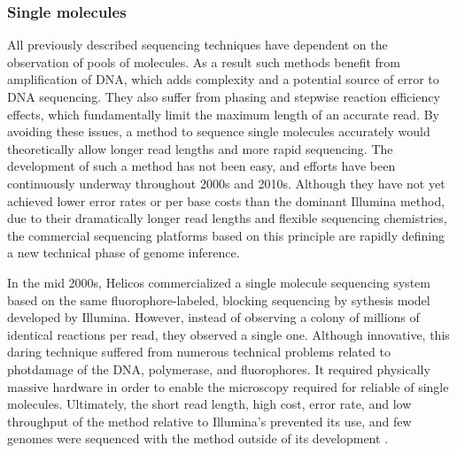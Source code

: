 \subsubsection{Single molecules}

All previously described sequencing techniques have dependent on the observation of pools of molecules.
As a result such methods benefit from amplification of DNA, which adds complexity and a potential source of error to DNA sequencing.
They also suffer from phasing and stepwise reaction efficiency effects, which fundamentally limit the maximum length of an accurate read.
By avoiding these issues, a method to sequence single molecules accurately would theoretically allow longer read lengths and more rapid sequencing.
The development of such a method has not been easy, and efforts have been continuously underway throughout 2000s and 2010s.
Although they have not yet achieved lower error rates or per base costs than the dominant Illumina method, due to their dramatically longer read lengths and flexible sequencing chemistries, the commercial sequencing platforms based on this principle are rapidly defining a new technical phase of genome inference.

In the mid 2000s, Helicos commercialized a single molecule sequencing system based on the same fluorophore-labeled, blocking sequencing by sythesis model developed by Illumina.
However, instead of observing a colony of millions of identical reactions per read, they observed a single one.
Although innovative, this daring technique suffered from numerous technical problems related to photdamage of the DNA, polymerase, and fluorophores.
It required physically massive hardware in order to enable the microscopy required for reliable of single molecules.
Ultimately, the short read length, high cost, error rate, and low throughput of the method relative to Illumina's prevented its use, and few genomes were sequenced with the method outside of its development \cite{harris2008single}.

